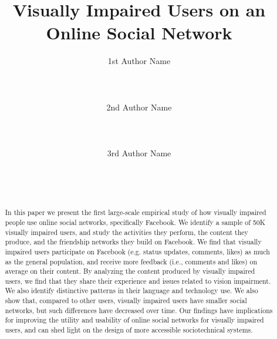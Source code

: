 \documentclass{sigchi}
\begin{document}
\title{Visually Impaired Users on an Online Social Network}

\author{
  \alignauthor 1st Author Name\\
    \\
    \\
    \\
  \alignauthor 2nd Author Name\\
    \\
    \\
    \\
  \alignauthor 3rd Author Name\\
    \\
    \\
    \\
}

\maketitle

\begin{abstract}


In this paper we present the first large-scale empirical study of how visually impaired people use online social networks, specifically Facebook. We identify a sample of 50K visually impaired users, and study the activities they perform, the content they produce, and the friendship networks they build on Facebook. We find that visually impaired users participate on Facebook (e.g. status updates, comments, likes) as much as the general population, and receive more feedback (i.e., comments and likes) on average on their content. By analyzing the content produced by visually impaired users, we find that they share their experience and issues related to vision impairment. We also identify distinctive patterns in their language and technology use. We also show that, compared to other users, visually impaired users have  smaller social networks, but such differences have decreased over time. Our findings have implications for improving the utility and usability of online social networks for visually impaired users, and can shed light on the design of more accessible sociotechnical systems.




\end{abstract}
\end{document}
